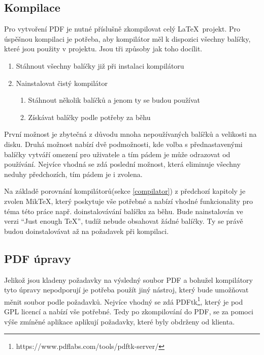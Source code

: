 \subsection{Kompilace}
Pro vytvoření PDF je nutné příslušně zkompilovat celý \LaTeX\ projekt. Pro úspěšnou kompilaci je potřeba, aby kompilátor měl k dispozici všechny balíčky, které jsou použity v projektu. Jsou tři způsoby jak toho docílit.
\begin{enumerate}
	\item Stáhnout všechny balíčky již při instalaci kompilátoru
	\item Nainstalovat čistý kompilátor
		\begin{enumerate}
			\item Stáhnout několik balíčků a jenom ty se budou používat
			\item Získávat balíčky podle potřeby za běhu
		\end{enumerate}
\end{enumerate}
První možnost je zbytečná z důvodu mnoha nepoužívaných balíčků a velikosti na disku. Druhá možnost nabízí dvě podmožnosti, kde volba s přednastavenými balíčky vytváří omezení pro uživatele a tím pádem je může odrazovat od používání. Nejvíce vhodná se zdá poslední možnost, která eliminuje všechny neduhy předchozích, tím pádem je i zvolena.
\par
Na základě porovnání kompilátorů(sekce \ref{compilator}) z předchozí kapitoly je zvolen MikTeX, který poskytuje vše potřebné a nabízí vhodné funkcionality pro téma této práce např. doinstalovávání balíčku za běhu. Bude nainstalován ve verzi \enquote{Just enough TeX}, tudíž nebude obsahovat žádné balíčky. Ty se právě budou doinstalovávat až na požadavek při kompilaci.

\subsection{PDF úpravy}
Jelikož jsou kladeny požadavky na výsledný soubor PDF a bohužel kompilátory tyto úpravy nepodporují je potřeba použít jiný nástroj, který bude umožňovat měnit soubor podle požadavků. Nejvíce vhodný se zdá PDFtk\footnote{https://www.pdflabs.com/tools/pdftk-server/}, který je pod GPL licencí a nabízí vše potřebné. Tedy po zkompilování do PDF, se za pomoci výše zmíněné aplikace aplikují požadavky, které byly obdrženy od klienta.

